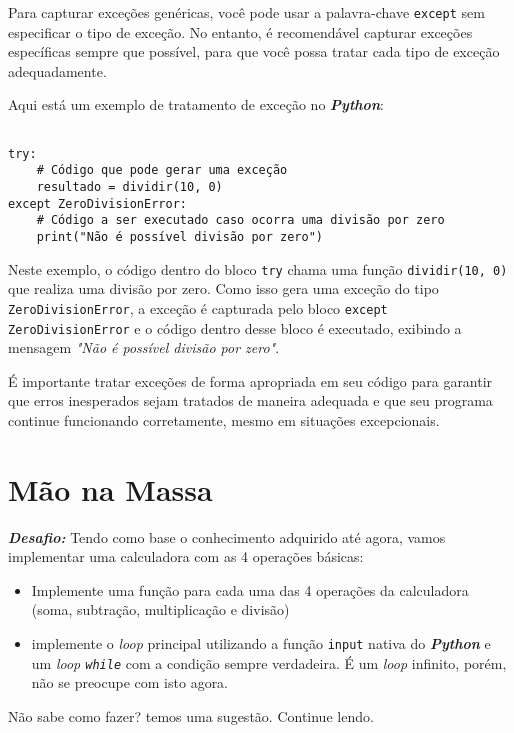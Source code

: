\documentclass[a4paper, 12pt, onecolumn,singlespacing]{article}
\begin{document}
Para capturar exceções genéricas, você pode usar a palavra-chave \texttt{except} sem especificar o tipo de exceção. No entanto, é recomendável capturar exceções específicas sempre que possível, para que você possa tratar cada tipo de exceção adequadamente.

Aqui está um exemplo de tratamento de exceção no \textbf{\textit{Python}}:

\begin{verbatim}

try:
	# Código que pode gerar uma exceção
	resultado = dividir(10, 0)
except ZeroDivisionError:
	# Código a ser executado caso ocorra uma divisão por zero
	print("Não é possível divisão por zero")

\end{verbatim}
Neste exemplo, o código dentro do bloco \texttt{try} chama uma função \texttt{dividir(10, 0)} que realiza uma divisão por zero. Como isso gera uma exceção do tipo \texttt{ZeroDivisionError}, a exceção é capturada pelo bloco \texttt{except ZeroDivisionError} e o código dentro desse bloco é executado, exibindo a mensagem \textit{"Não é possível divisão por zero"}.

É importante tratar exceções de forma apropriada em seu código para garantir que erros inesperados sejam tratados de maneira adequada e que seu programa continue funcionando corretamente, mesmo em situações excepcionais.

	\section{Mão na Massa}

	\textbf{\textit{Desafio: }} Tendo como base o conhecimento adquirido até agora, vamos implementar uma calculadora com as 4 operações básicas:
\begin{itemize}
	\item Implemente uma função para cada uma das 4 operações da calculadora (soma, subtração, multiplicação e divisão)
	\item implemente o \textit{loop} principal utilizando a função \texttt{input} nativa do \textbf{\textit{Python}} e um \textit{loop \texttt{while}} com a condição sempre verdadeira. É um \textit{loop} infinito, porém, não se preocupe com isto agora.
\end{itemize}

	Não sabe como fazer? temos uma sugestão. Continue lendo.
	
\end{document}
